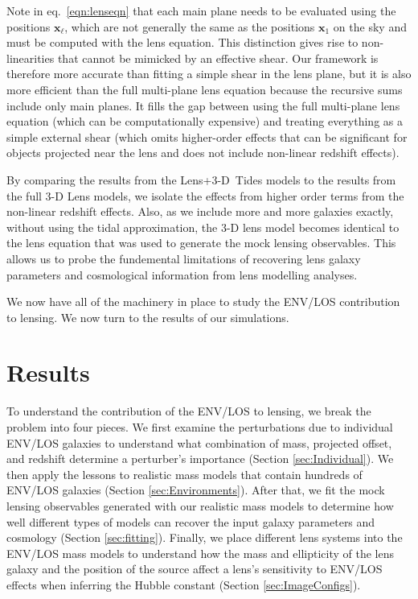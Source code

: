 \documentclass{emulateapj}
\newcommand\x[0]{\mathbf{x}}
\begin{document}
Note in eq.\ \ref{eqn:lenseqn} that each main plane needs to be evaluated using the positions $\x_\ell$, which are not generally the same as the positions $\x_1$ on the sky and must be computed with the lens equation. This distinction gives rise to non-linearities that cannot be mimicked by an effective shear. Our framework is therefore more accurate than fitting a simple shear in the lens plane, but it is also more efficient than the full multi-plane lens equation because the recursive sums include only main planes.  It fills the gap between using the full multi-plane lens equation (which can be computationally expensive) and treating everything as a simple external shear (which omits higher-order effects that can be significant for objects projected near the lens and does not include non-linear redshift effects).

 By comparing the results from the Lens+3-D~Tides models to the results from the full 3-D Lens models, we isolate the effects from higher order terms from the non-linear redshift effects. Also, as we include more and more galaxies exactly, without using the tidal approximation, the 3-D lens model becomes identical to the lens equation that was used to generate the mock lensing observables. This allows us to probe the fundemental limitations of recovering lens galaxy parameters and cosmological information from lens modelling analyses.  


 We now have all of the machinery in place to study the ENV/LOS contribution to lensing. We now turn to the results of our simulations.


\section{Results}

To understand the contribution of the ENV/LOS to lensing, we break the problem into four pieces. We first examine the perturbations due to individual ENV/LOS galaxies to understand what combination of mass, projected offset, and redshift determine a perturber’s importance  (Section \ref{sec:Individual}). We then apply the lessons to realistic mass models that contain hundreds of ENV/LOS galaxies (Section \ref{sec:Environments}). After that, we fit the mock lensing observables generated with our realistic mass models to determine how well different types of models can recover the input galaxy parameters and cosmology (Section \ref{sec:fitting}). Finally, we place different lens systems into the ENV/LOS mass models to understand how the mass and ellipticity of the lens galaxy and the position of the source affect a lens's sensitivity to ENV/LOS effects when inferring the Hubble constant (Section \ref{sec:ImageConfigs}). 
\end{document}
